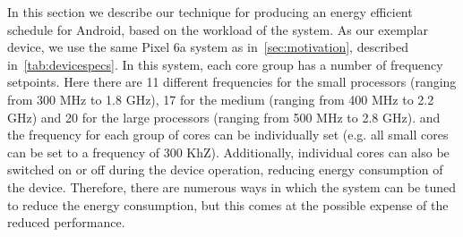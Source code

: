 \documentclass[conference]{IEEEtran}
\begin{document}
%   



In this section we describe our technique for producing an energy efficient schedule for Android, based on the workload of the system. As our exemplar device, we use the same Pixel 6a system as in~\cref{sec:motivation}, described in~\cref{tab:devicespecs}. In this system, each core group has a number of frequency setpoints.
Here there are 11 different frequencies for the small processors (ranging from 300 MHz to 1.8 GHz), 17 for the medium (ranging from 400 MHz to 2.2 GHz) and 20 for the large processors (ranging from 500 MHz to 2.8 GHz). and the frequency for each group of cores can be individually set (e.g. all small cores can be set to a frequency of 300 KhZ). Additionally, individual cores can also be switched on or off during the device operation, reducing energy consumption of the device. Therefore, there are numerous ways in which the system can be tuned to reduce the energy consumption, but this comes at the possible expense of the reduced performance.
\end{document}
